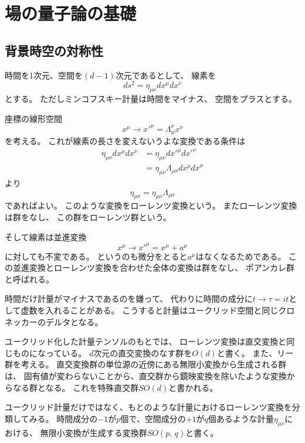 \documentclass[../../master.tex]{subfiles}
\begin{document}
\chapter{場の量子論の基礎}
\section{背景時空の対称性}
時間を1次元、空間を\((d-1)\)次元であるとして、
線素を
\begin{equation}
    ds^2 = \eta_{\mu\nu}dx^\mu dx^\nu
\end{equation}
とする。
ただしミンコフスキー計量は時間をマイナス、
空間をプラスとする。

座標の線形空間
\setcounter{equation}{5}
\begin{equation}
    x^\mu \rightarrow {x'}^\mu = \Lambda_\mu^\nu x^\nu
\end{equation}
を考える。
これが線素の長さを変えないうよな変換である条件は
\begin{align*}
    \eta_{\mu\nu}dx^\mu dx^\nu
    &= \eta_{\mu\nu}d{x'}^\mu d{x'}^\nu\\
    &= \eta_{\mu\nu}\Lambda_{\rho\sigma} dx^\rho dx^\sigma
\end{align*}
より
\begin{equation}
    \eta_{\rho\sigma} = \eta_{\mu\nu}\Lambda_{\rho\sigma}
\end{equation}
であればよい。
このような変換をローレンツ変換という。
またローレンツ変換は群をなし、
この群をローレンツ群という。

そして線素は並進変換
\begin{equation}
    x^\mu \rightarrow {x'}^\mu = x^\mu + a^\mu
\end{equation}
に対しても不変である。
というのも微分をとると\(a^\mu\)はなくなるためである。
この並進変換とローレンツ変換を合わせた全体の変換は群をなし、
ポアンカレ群と呼ばれる。

時間だけ計量がマイナスであるのを嫌って、
代わりに時間の成分に\(t\rightarrow\tau=it\)として虚数を入れることがある。
こうすると計量はユークリッド空間と同じクロネッカーのデルタとなる。

ユークリッド化した計量テンソルのもとでは、
ローレンツ変換は直交変換と同じものになっている。
\(d\)次元の直交変換のなす群を\(O(d)\)と書く。
また、リー群を考える。
直交変換群の単位源の近傍にある無限小変換から生成される群は、
固有値が変わらないことから、直交群から鏡映変換を除いたような変換からなる群となる。
これを特殊直交群\(SO(d)\)と書かれる。

ユークリッド計量だけではなく、もとのような計量におけるローレンツ変換を分類してみる。
時間成分の\(-1\)が\(p\)個で、空間成分の\(+1\)が\(q\)個あるような計量\(\eta_{\mu\nu}\)における、
無限小変換が生成する変換群\(SO(p,\,q)\)と書く。
\end{document}
